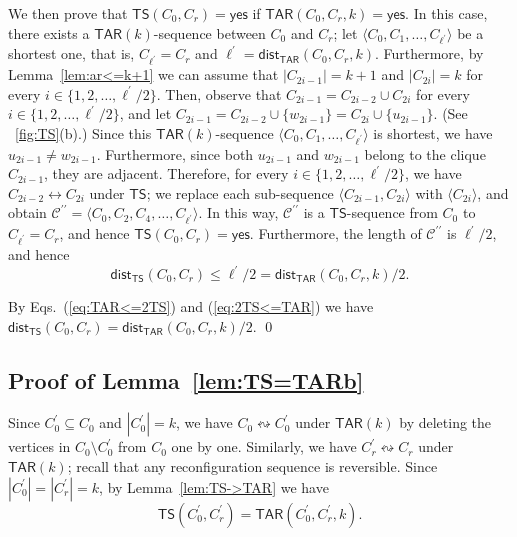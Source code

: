 \documentclass{llncs}
\newcommand{\onestep}{\leftrightarrow}
\newcommand{\sevstep}{\leftrightsquigarrow}
\newcommand{\TAR}[1]{\mathsf{TAR}(#1)}
\newcommand{\TS}{\mathsf{TS}}
\newcommand{\ini}{0}
\newcommand{\tar}{r}
\newcommand{\cliq}{C}
\newcommand{\YES}{\mathsf{yes}}
\newcommand{\TARins}[3]{\mathsf{TAR}(#1,#2,#3)}
\newcommand{\TSins}[2]{\mathsf{TS}(#1,#2)}
\newcommand{\distTAR}[3]{\mathsf{dist_{TAR}}(#1,#2,#3)}
\newcommand{\distTS}[2]{\mathsf{dist_{TS}}(#1,#2)}
\newcounter{one}
\begin{document}
	We then prove that $\TSins{\cliq_{\ini}}{\cliq_{\tar}} = \YES$ if $\TARins{\cliq_{\ini}}{\cliq_{\tar}}{k} = \YES$.
	In this case, there exists a $\TAR{k}$-sequence between $\cliq_{\ini}$ and $\cliq_{\tar}$; 
let $\langle \cliq_{0}, \cliq_{1}, \dots, \cliq_{\ell^\prime} \rangle$ be a shortest one, that is, $\cliq_{\ell^\prime} = \cliq_{\tar}$ and $\ell^\prime = \distTAR{\cliq_{\ini}}{\cliq_{\tar}}{k}$.
	Furthermore, by Lemma~\ref{lem:ar<=k+1} we can assume that $|\cliq_{2i-1}| = k+1$ and $|\cliq_{2i}| = k$ for every $i \in \{1, 2, \ldots, \ell^\prime/2 \}$. 
	Then, observe that $\cliq_{2i-1} = \cliq_{2i-2} \cup \cliq_{2i}$ for every $i \in \{1, 2, \ldots, \ell^\prime/2 \}$, and let $\cliq_{2i-1} = \cliq_{2i-2} \cup \{w_{2i-1} \}  = \cliq_{2i} \cup \{u_{2i-1}\}$.
(See \figurename~\ref{fig:TS}(b).)
	Since this $\TAR{k}$-sequence $\langle \cliq_{0}, \cliq_{1}, \dots, \cliq_{\ell^\prime} \rangle$ is shortest, we have $u_{2i-1} \neq w_{2i-1}$.
	Furthermore, since both $u_{2i-1}$ and $w_{2i-1}$ belong to the clique $\cliq_{2i-1}$, they are adjacent.
	Therefore, for every $i \in \{1, 2, \ldots, \ell^\prime/2 \}$, we have $\cliq_{2i-2} \onestep C_{2i}$ under $\TS$;
we replace each sub-sequence $\langle \cliq_{2i-1}, \cliq_{2i} \rangle$ with $\langle \cliq_{2i} \rangle$, and obtain $\mathcal{C}^{\prime \prime} = \langle \cliq_0, \cliq_2, \cliq_4, \ldots, \cliq_{\ell^\prime} \rangle$.
	In this way, $\mathcal{C}^{\prime \prime}$ is a $\TS$-sequence from $\cliq_{\ini}$ to $\cliq_{\ell^\prime} = \cliq_{\tar}$, and hence $\TSins{\cliq_{\ini}}{\cliq_{\tar}} = \YES$. 
	Furthermore, the length of $\mathcal{C}^{\prime \prime}$ is $\ell^\prime/2$, and hence 
	\begin{equation} \label{eq:2TS<=TAR}
		\distTS{\cliq_{\ini}}{\cliq_{\tar}} \le \ell^\prime/2 = \distTAR{\cliq_{\ini}}{\cliq_{\tar}}{k}/2. 
	\end{equation}

	By Eqs.~(\ref{eq:TAR<=2TS}) and (\ref{eq:2TS<=TAR}) we have $\distTS{\cliq_{\ini}}{\cliq_{\tar}} = \distTAR{\cliq_{\ini}}{\cliq_{\tar}}{k} / 2$.
	\qed



	
	\subsection{Proof of Lemma~\ref{lem:TS=TARb}}
Since $\cliq_{\ini}^\prime \subseteq \cliq_{\ini}$ and $|\cliq_{\ini}^\prime| = k$, we have $\cliq_{\ini} \sevstep \cliq_{\ini}^\prime$ under $\TAR{k}$ by deleting the vertices in $\cliq_{\ini} \setminus \cliq_{\ini}^\prime$ from $\cliq_{\ini}$ one by one. 
	Similarly, we have $\cliq_{\tar}^\prime \sevstep \cliq_{\tar}$ under $\TAR{k}$;
recall that any reconfiguration sequence is reversible.
	Since $|\cliq_{\ini}^\prime| = |\cliq_{\tar}^\prime| = k$, by Lemma~\ref{lem:TS->TAR} we have 
	\begin{equation} \label{eq:TS=TAR}
		\TSins{\cliq_{\ini}^\prime}{\cliq_{\tar}^\prime} = \TARins{\cliq_{\ini}^\prime}{\cliq_{\tar}^\prime}{k}.
	\end{equation}
\end{document}
